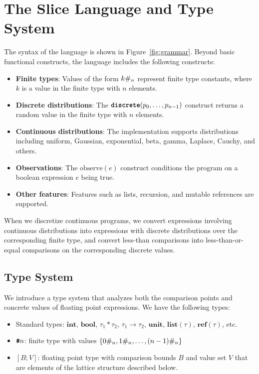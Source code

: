 \section{The Slice Language and Type System}\label{sec:language}



The syntax of the \Slice{} language is shown in Figure~\ref{fig:grammar}.
Beyond basic functional constructs, the language includes the following constructs:
\begin{itemize}
\item \textbf{Finite types}: Values of the form $k\#_{n}$ represent finite type constants, where $k$ is a value in the finite type with $n$ elements.
\item \textbf{Discrete distributions}: The $\text{\ttfamily\bfseries discrete}(p_0, \ldots, p_{n-1})$ construct returns a random value in the finite type with $n$ elements.
\item \textbf{Continuous distributions}: The implementation supports distributions including uniform, Gaussian, exponential, beta, gamma, Laplace, Cauchy, and others.
\item \textbf{Observations}: The $\text{observe}(e)$ construct conditions the program on a boolean expression $e$ being true.
\item \textbf{Other features}: Features such as lists, recursion, and mutable references are supported.
\end{itemize}

When we discretize continuous programs, we convert expressions involving continuous distributions into expressions with discrete distributions over the corresponding finite type, and convert less-than comparisons into less-than-or-equal comparisons on the corresponding discrete values.

\subsection{Type System}\label{sec:type-system}

We introduce a type system that analyzes both the comparison points and concrete values of floating point expressions. We have the following types:
\begin{itemize}
    \item Standard types: $\textbf{int}$, $\textbf{bool}$, $\tau_1 * \tau_2$, $\tau_1 \rightarrow \tau_2$, $\textbf{unit}$, $\textbf{list}(\tau)$, $\textbf{ref}(\tau)$, etc.
    \item $\text{\ttfamily\bfseries \#}n$: finite type with values $\{0\#_{n}, 1\#_{n}, \ldots, (n-1)\#_{n}\}$
    \item \float$[B; V]$: floating point type with comparison bounds $B$ and value set $V$ that are elements of the lattice structure described below.
\end{itemize}

